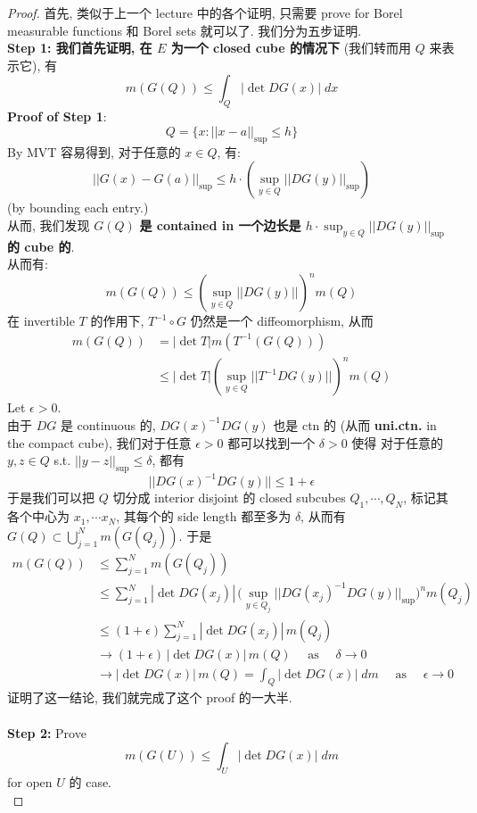 \documentclass[lang=cn,11pt]{elegantbook}
\begin{document}
\begin{proof}
首先, 类似于上一个 lecture 中的各个证明, 只需要 prove for Borel measurable functions 和 Borel sets 就可以了. 我们分为五步证明.\\
\textbf{Step 1: 我们首先证明, 在 $E$ 为一个 closed cube 的情况下} (我们转而用 $Q$ 来表示它), 有 \[
m(G(Q)) \leq \int_Q |\det DG(x)| \; dx
\]
\textbf{Proof of Step 1}: \[Q = \{x : ||x-a||_{\sup} \leq h\}  \]
By MVT 容易得到, 对于任意的 $x\in Q$, 有: \[
||G(x)-G(a)||_{\sup} \leq h \cdot ({\sup}_{y\in Q} ||DG(y)||_{\sup})
\]
(by bounding each entry.)\\
从而, 我们发现  $G(Q)$ \textbf{是 contained in 一个边长是 $h \cdot {\sup}_{y\in Q} ||DG(y)||_{\sup} $ 的 cube 的}.\\
从而有: \[
m(G(Q)) \leq ({\sup}_{y\in Q} ||DG(y)||)^n m(Q)
\]
在 invertible $T$ 的作用下, $T^{-1}\circ G$ 仍然是一个 diffeomorphism, 从而 
\begin{align}
    m(G(Q)) &= |\det T| m(T^{-1}(G(Q))) \\
    &\leq |\det T|({\sup}_{y\in Q} ||T^{-1}DG(y)||)^n m(Q)
\end{align}
Let $\epsilon >0$.\\
由于 $DG$ 是 continuous 的, $DG(x)^{-1} DG(y)$ 也是 ctn 的 (从而 \textbf{uni.ctn.} in the compact cube), 我们对于任意 $\epsilon > 0$ 都可以找到一个 $\delta >0 $ 使得 对于任意的 $y,z \in Q$ s.t. $||y-z||_{\sup} \leq \delta$, 都有 
\[ ||DG(x)^{-1} DG(y)||    \leq 1+ \epsilon\]
于是我们可以把 $Q$ 切分成 interior disjoint 的 closed subcubes $Q_1,\cdots,Q_N$, 标记其各个中心为 $x_1,\cdots x_N$, 其每个的 side length 都至多为 $\delta$,  从而有 $G(Q) \subset \bigcup_{j=1}^N m(G(Q_j)) $. 
于是
\begin{align}
    m(G(Q)) &\leq \sum_{j=1}^N m(G(Q_j)) \\
    & \leq \sum_{j=1}^N |\det DG(x_j)| \, \big( {\sup}_{y\in Q_j} ||DG(x_j)^{-1} DG(y)||_{\sup}\big)^n m(Q_j)\\
    &\leq (1 + \epsilon) \sum_{j=1}^N |\det DG(x_j)| \, m(Q_j)\\
&    \rightarrow  (1+\epsilon)\,|\det DG(x)| \,m(Q) \quad \text{ as } \quad\delta\to 0 \\
& \rightarrow |\det DG(x)| \,m(Q)=\int_Q |\det DG(x)| \; dm \quad \text{ as } \quad\epsilon\to 0
\end{align}
证明了这一结论, 我们就完成了这个 proof 的一大半.\\\\
\textbf{Step 2: }Prove \[m(G(U)) \leq \int_U|\det DG(x)| \; dm\] for open $U$ 的 case.\\

\end{proof}
\end{document}
